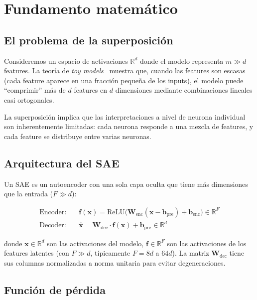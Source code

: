 \documentclass[11pt,a4paper]{report}
\theoremstyle{definition}
\begin{document}
\section{Fundamento matemático}

\subsection{El problema de la superposición}

Consideremos un espacio de activaciones $\mathbb{R}^d$ donde el modelo representa $m \gg d$ features. La teoría de \emph{toy models}~\cite{elhage2022superposition} muestra que, cuando las features son escasas (cada feature aparece en una fracción pequeña de los inputs), el modelo puede ``comprimir'' más de $d$ features en $d$ dimensiones mediante combinaciones lineales casi ortogonales.

La superposición implica que las interpretaciones a nivel de neurona individual son inherentemente limitadas: cada neurona responde a una mezcla de features, y cada feature se distribuye entre varias neuronas.

\subsection{Arquitectura del SAE}

Un SAE es un autoencoder con una sola capa oculta que tiene más dimensiones que la entrada ($F \gg d$):

\begin{align*}
\text{Encoder:}&\quad \mathbf{f}(\mathbf{x}) = \text{ReLU}\big(\mathbf{W}_{\text{enc}}(\mathbf{x} - \mathbf{b}_{\text{pre}}) + \mathbf{b}_{\text{enc}}\big) \in \mathbb{R}^F \\
\text{Decoder:}&\quad \hat{\mathbf{x}} = \mathbf{W}_{\text{dec}} \cdot \mathbf{f}(\mathbf{x}) + \mathbf{b}_{\text{pre}} \in \mathbb{R}^d
\end{align*}

donde $\mathbf{x} \in \mathbb{R}^d$ son las activaciones del modelo, $\mathbf{f} \in \mathbb{R}^F$ son las activaciones de los features latentes (con $F \gg d$, típicamente $F = 8d$ a $64d$). La matriz $\mathbf{W}_{\text{dec}}$ tiene sus columnas normalizadas a norma unitaria para evitar degeneraciones.

\subsection{Función de pérdida}
\end{document}
